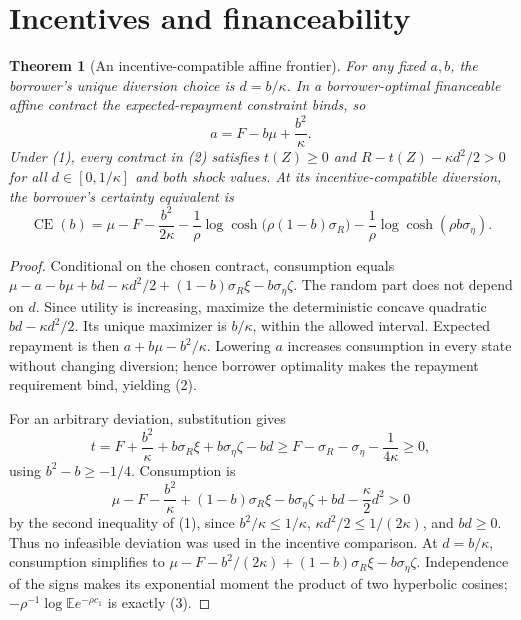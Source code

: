 \documentclass[11pt,a4paper]{article}
\newtheorem{theorem}{Theorem}[section]
\theoremstyle{remark}
\newcommand{\E}{\mathbb E}
\begin{document}
\section{Incentives and financeability}
\begin{theorem}[An incentive-compatible affine frontier]
For any fixed $a,b$, the borrower's unique diversion choice is $d=b/\kappa$. In a borrower-optimal financeable affine contract the expected-repayment constraint binds, so
\[
 a=F-b\mu+\frac{b^2}{\kappa}. \tag{2}
\]
Under (1), every contract in (2) satisfies $t(Z)\ge0$ and $R-t(Z)-\kappa d^2/2>0$ for all $d\in[0,1/\kappa]$ and both shock values. At its incentive-compatible diversion, the borrower's certainty equivalent is
\[
 \operatorname{CE}(b)=\mu-F-\frac{b^2}{2\kappa}
 -\frac1\rho\log\cosh\big(\rho(1-b)\sigma_R\big)
 -\frac1\rho\log\cosh(\rho b\sigma_\eta). \tag{3}
\]
\end{theorem}
\begin{proof}
Conditional on the chosen contract, consumption equals
$\mu-a-b\mu+bd-\kappa d^2/2+(1-b)\sigma_R\xi-b\sigma_\eta\zeta$.
The random part does not depend on $d$. Since utility is increasing, maximize the deterministic concave quadratic $bd-\kappa d^2/2$. Its unique maximizer is $b/\kappa$, within the allowed interval. Expected repayment is then $a+b\mu-b^2/\kappa$. Lowering $a$ increases consumption in every state without changing diversion; hence borrower optimality makes the repayment requirement bind, yielding (2).

For an arbitrary deviation, substitution gives
\[
 t=F+\frac{b^2}{\kappa}+b\sigma_R\xi+b\sigma_\eta\zeta-bd
 \ge F-\sigma_R-\sigma_\eta-\frac1{4\kappa}\ge0,
\]
using $b^2-b\ge-1/4$. Consumption is
\[
 \mu-F-\frac{b^2}{\kappa}+(1-b)\sigma_R\xi-b\sigma_\eta\zeta+bd-\frac\kappa2d^2
 >0
\]
by the second inequality of (1), since $b^2/\kappa\le1/\kappa$, $\kappa d^2/2\le1/(2\kappa)$, and $bd\ge0$. Thus no infeasible deviation was used in the incentive comparison. At $d=b/\kappa$, consumption simplifies to
$\mu-F-b^2/(2\kappa)+(1-b)\sigma_R\xi-b\sigma_\eta\zeta$.
Independence of the signs makes its exponential moment the product of two hyperbolic cosines; $-\rho^{-1}\log\E e^{-\rho c_1}$ is exactly (3).
\end{proof}
\end{document}
